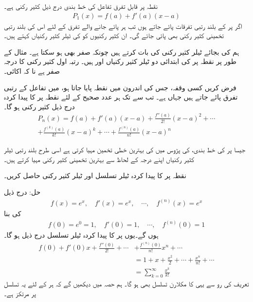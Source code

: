 نقطہ  پر قابل تفرق تفاعل  کی خط بندی درج ذیل کثیر رکنی ہے۔
\begin{align*}
P_1(x)=f(a)+f'(a)(x-a)
\end{align*} 
اگر  پر  کے بلند رتبی تفرقات پائے جاتے ہوں تب ہر پائے جانے والے تفرق کے لئے  اس کی بلند رتبی تخمینی کثیر رکنی بھی پائی جائے گی۔  ان کثیر رکنیوں کو  کی ٹیلر کثیر رکنیاں کہتے ہیں۔

ہم   کی بجائے   ٹیلر کثیر رکنی کی بات کرتے ہیں چونکہ  صفر بھی ہو سکتا ہے۔ مثال کے طور پر نقطہ  پر  کی ابتدائی دو ٹیلر کثیر رکنیاں  اور  ہیں۔ رتبہ اول کثیر رکنی کا درجہ صفر ہے نا کہ اکائی۔

فرض کریں کسی وقفہ، جس کی اندرون میں نقطہ  پایا جاتا ہو، میں تفاعل  کے  رتبی تفرق پائے جاتے ہیں جہاں  ہے۔ تب  سے  تک ہر عدد صحیح کے لئے نقطہ  پر  کا پیدا کردہ  درج ذیل کثیر رکنی ہو گا۔
\begin{multline*}
P_n(x)=f(a)+f'(a)(x-a)+\frac{f''(a)}{2!}(x-a)^2+\cdots\\
+\frac{f^{(k)}(a)}{k!}(x-a)^k+\cdots+\frac{f^{(n)}(a)}{n!}(x-a)^n
\end{multline*}

جیسا  پر  کی خط بندی،  کی پڑوس میں  کی  بہترین خطی تخمین مہیا کرتی ہے اسی طرح بلند رتبی ٹیلر کثیر رکنیاں اپنے درجہ کے لحاظ سے بہترین تخمینی کثیر رکنی مہیا کرتے ہیں۔

نقطہ  پر  کا پیدا کردہ ٹیلر تسلسل اور ٹیلر کثیر رکنی حاصل کریں۔

حل:\quad
درج ذیل
\begin{align*}
f(x)=e^x,\quad f'(x)=e^x,\quad \cdots, \quad f^{(n)}(x)=e^x
\end{align*}
کی بنا  
\begin{align*}
f(0)=e^0=1,\quad f'(0)=1,\quad \cdots, \quad f^{(n)}(0)=1
\end{align*}
ہوں گے۔یوں  پر  کا پیدا کردہ ٹیلر تسلسل درج ذیل ہو گا۔
\begin{align*}
f(0)+f'(0)x+\frac{f''(0)}{2!}+\cdots &+\frac{f^{(n)}(0)}{n!}x^n+\cdots\\
&=1+x+\frac{x^2}{2}+\cdots+\frac{x^n}{n!}+\cdots\\
&=\sum_{k=0}^{\infty}\frac{x^k}{k!}
\end{align*}
تعریف کی رو سے یہی  کا مکلارن تسلسل بھی ہو گا۔ ہم حصہ  میں دیکھیں گے کہ ہر  کے لئے یہ تسلسل  پر مرتکز ہے۔ 

